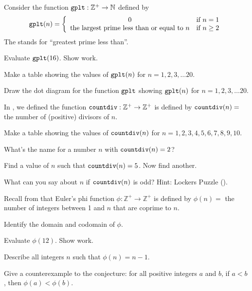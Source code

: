 \begin{exer}[\exerP] %
\label{exer_eval_topprime}
    Consider the function $\texttt{gplt}:\mathbb{Z}^+ \to \mathbb{N}$ defined by     
            $$\texttt{gplt}(n)=\left\{\begin{array}{cl}
                    0 & \text{if }n=1 \\
                    \text{the largest prime less than or equal to }n & \text{if } n \ge 2 \\
            \end{array}\right.$$
    The  stands for ``greatest prime less than''.
    \begin{exerpart}
        \item Evaluate $\texttt{gplt}(16)$.  Show work.
        \item Make a table showing the values of $\texttt{gplt}(n)$ for $n=1,2,3,\ldots 20$.
        \item Draw the dot diagram for the function $\texttt{gplt}$ showing $\texttt{gplt}(n)$ for $n=1,2,3,\ldots 20$.
    \end{exerpart}
\end{exer}

\begin{exer}[\exerU] %
\label{exer_countdiv}
    In , we defined the function $\texttt{countdiv}: \mathbb{Z}^+ \to \mathbb{Z}^+$ is defined by $\texttt{countdiv}(n)=$ the number of (positive) divisors of $n$.
        \begin{exerpart}
            \item Make a table showing the values of $\texttt{countdiv}(n)$ for $n = 1, 2, 3, 4, 5, 6, 7, 8, 9, 10$.
            \item What's the name for a number $n$ with $\texttt{countdiv}(n) = 2$?
            \item Find a value of $n$ such that $\texttt{countdiv}(n) = 5$.  Now find another.
            \item What can you say about $n$ if $\texttt{countdiv}(n)$ is odd?  Hint: Lockers Puzzle (). 
        \end{exerpart}
\end{exer}

\begin{exer}[\exerU] %
\label{exer_fn_euler_phi_revisited}
    Recall from  that Euler's phi function $\phi: \mathbb{Z}^+ \to \mathbb{Z}^+$ is defined by $\phi(n)=$ the number of integers between 1 and $n$ that are coprime to $n$.  
        \begin{exerpart}
            \item Identify the domain and codomain of $\phi$.
            \item Evaluate $\phi(12)$.  Show work.
            \item Describe all integers $n$ such that $\phi(n)=n-1$.
            \item Give a counterexample to the conjecture: for all positive integers $a$ and $b$, if $a < b$, then $\phi(a) < \phi(b)$.
        \end{exerpart}
\end{exer}


